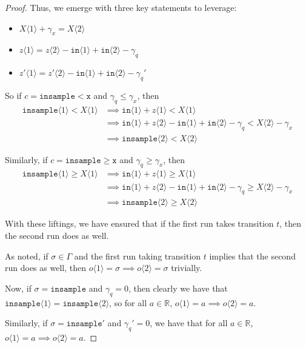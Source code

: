\documentclass[12pt]{article}
\newcommand{\RR}{\mathbb{R}}
\newcommand{\gguard}[1][x]{\texttt{insample}\geq#1}
\newcommand{\lguard}[1][x]{\texttt{insample} < #1}
\newcommand{\brangle}[1]{\langle#1 \rangle}
\theoremstyle{definition}
\begin{document}
\begin{proof}
Thus, we emerge with three key statements to leverage:\begin{itemize}
    \item $X\brangle{1} + \gamma_x = X\brangle{2}$
    \item $z\brangle{1} = z\brangle{2} - \texttt{in}\brangle{1}+\texttt{in}\brangle{2}-\gamma_q$
    \item $z'\brangle{1} = z'\brangle{2} - \texttt{in}\brangle{1}+\texttt{in}\brangle{2}-\gamma_q'$
\end{itemize}

So if $c=\lguard[\texttt{x}]$ and $\gamma_q\leq \gamma_x$, then \begin{align*}
    \texttt{insample}\brangle{1}<X\brangle{1}&\implies \texttt{in}\brangle{1}+z\brangle{1}<X\brangle{1}\\
    &\implies \texttt{in}\brangle{1}+z\brangle{2}-\texttt{in}\brangle{1}+\texttt{in}\brangle{2}-\gamma_q<X\brangle{2}-\gamma_x\\
    &\implies \texttt{insample}\brangle{2}<X\brangle{2}
\end{align*}

Similarly, if $c=\gguard[\texttt{x}]$ and $\gamma_q\geq \gamma_x$, then \begin{align*}
    \texttt{insample}\brangle{1}\geq X\brangle{1}&\implies \texttt{in}\brangle{1}+z\brangle{1}\geq X\brangle{1}\\
    &\implies \texttt{in}\brangle{1}+z\brangle{2}-\texttt{in}\brangle{1}+\texttt{in}\brangle{2}-\gamma_q\geq X\brangle{2}-\gamma_x\\
    &\implies \texttt{insample}\brangle{2}\geq X\brangle{2}
\end{align*}

With these liftings, we have ensured that if the first run takes transition $t$, then the second run does as well. 

As noted, if $\sigma \in \Gamma$ and the first run taking transition $t$ implies that the second run does as well, then $o\brangle{1} = \sigma \implies o\brangle{2}=\sigma$ trivially.

Now, if $\sigma=\texttt{insample}$ and $\gamma_q=0$, then clearly we have that $\texttt{insample}\brangle{1}=\texttt{insample}\brangle{2}$, so for all $a\in \RR$, $o\brangle{1} = a\implies o\brangle{2} = a$.

Similarly, if $\sigma=\texttt{insample}'$ and $\gamma_q'=0$, we have that for all $a\in \RR$, $o\brangle{1} = a\implies o\brangle{2} = a$.


\end{proof}
\end{document}

